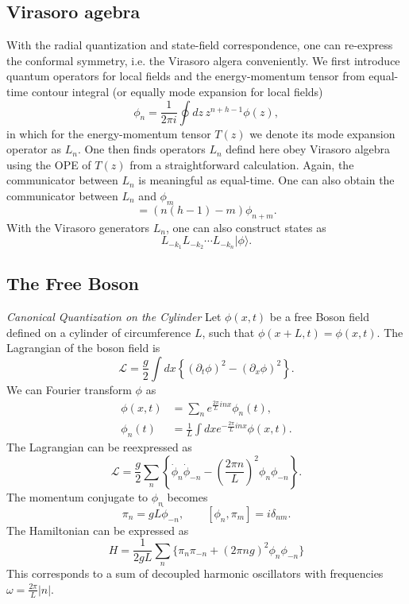 \documentclass[submission, PhysLectNotes]{SciPost}
\begin{document}
\subsection{Virasoro agebra}
With the radial quantization and state-field correspondence, one can re-express the conformal symmetry, i.e. the Virasoro algera conveniently.  We first introduce quantum operators for local fields and the energy-momentum tensor from equal-time contour integral (or equally mode expansion for local fields)
\begin{equation}
	\phi_n = \frac{1}{2\pi i}\oint dz \, z^{n+h-1} \phi(z),
\end{equation}
in which for the energy-momentum tensor $T(z)$ we denote its mode expansion operator as $L_n$. One then finds operators $L_n$ defind here obey Virasoro algebra using the OPE of $T(z)$ from a straightforward calculation. Again, the communicator between $L_n$ is meaningful as equal-time. One can also obtain the communicator between $L_n$ and $\phi_m$
\begin{equation}
	[L_n, \phi_m] = \left(n(h-1)-m\right) \phi_{n+m}.
\end{equation}
With the Virasoro generators $L_n$, one can also construct states as
\begin{equation}
L_{-k_1}L_{-k_2} \cdots L_{-k_n} \vert \phi \rangle.
\end{equation}

\subsection{The Free Boson}
{\it Canonical Quantization on the Cylinder}
Let $\phi(x,t)$ be a free Boson field defined on a cylinder of circumference $L$, such that $\phi(x+L,t) = \phi(x,t)$. The Lagrangian of the boson field is
\begin{equation}
  \mathcal{L} = \frac{g}{2}\int dx \left\{(\partial_t\phi)^2-(\partial_x \phi)^2\right\}.
\end{equation}
We can Fourier transform $\phi$ as
\begin{align}
  \phi(x,t) &= \sum_n e^{\frac{2\pi}{L}inx}\phi_n(t), \\
  \phi_n(t) &= \frac{1}{L}\int dx e^{-\frac{2\pi}{L}inx}\phi(x,t).
\end{align}
The Lagrangian can be reexpressed as
\begin{equation}
  \mathcal{L} = \frac{g}{2}\sum_n\left\{\dot{\phi}_n\dot{\phi}_{-n}-\left(\frac{2\pi n}{L}\right)^2\phi_n\phi_{-n}\right\}.
\end{equation}
The momentum conjugate to $\phi_n$ becomes
\begin{equation}
  \pi_n = gL\dot{\phi}_{-n}, \qquad [\phi_n,\pi_m] = i\delta_{nm}.
\end{equation}
The Hamiltonian can be expressed as
\begin{equation}
  H = \frac{1}{2gL}\sum_n\{\pi_n\pi_{-n}+(2\pi ng)^2\phi_n\phi_{-n}\}
\end{equation}
This corresponds to a sum of decoupled harmonic oscillators with frequencies $\omega = \frac{2\pi}{L}\lvert n\rvert$.
\end{document}
